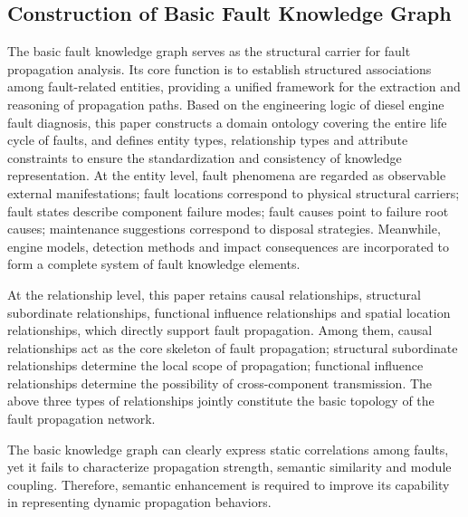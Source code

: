 \documentclass[conference]{IEEEconf}
\begin{document}
\subsection{Construction of Basic Fault Knowledge Graph}
The basic fault knowledge graph serves as the structural carrier for fault propagation analysis. Its core function is to establish structured associations among fault-related entities, providing a unified framework for the extraction and reasoning of propagation paths. Based on the engineering logic of diesel engine fault diagnosis, this paper constructs a domain ontology covering the entire life cycle of faults, and defines entity types, relationship types and attribute constraints to ensure the standardization and consistency of knowledge representation.
At the entity level, fault phenomena are regarded as observable external manifestations; fault locations correspond to physical structural carriers; fault states describe component failure modes; fault causes point to failure root causes; maintenance suggestions correspond to disposal strategies. Meanwhile, engine models, detection methods and impact consequences are incorporated to form a complete system of fault knowledge elements.

At the relationship level, this paper retains causal relationships, structural subordinate relationships, functional influence relationships and spatial location relationships, which directly support fault propagation. Among them, causal relationships act as the core skeleton of fault propagation; structural subordinate relationships determine the local scope of propagation; functional influence relationships determine the possibility of cross-component transmission. The above three types of relationships jointly constitute the basic topology of the fault propagation network.

The basic knowledge graph can clearly express static correlations among faults, yet it fails to characterize propagation strength, semantic similarity and module coupling. Therefore, semantic enhancement is required to improve its capability in representing dynamic propagation behaviors.
\end{document}
